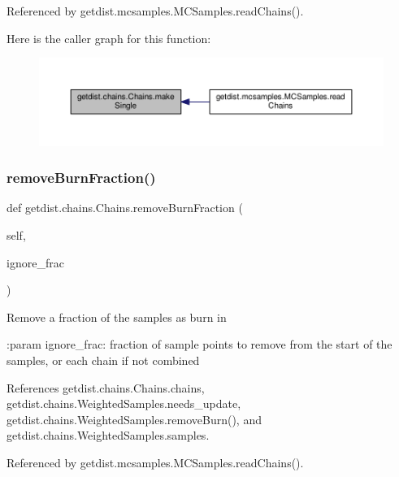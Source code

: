 Referenced by getdist.\+mcsamples.\+M\+C\+Samples.\+read\+Chains().

Here is the caller graph for this function\+:
\nopagebreak
\begin{figure}[H]
\begin{center}
\leavevmode
\includegraphics[width=350pt]{classgetdist_1_1chains_1_1Chains_abf8a89dbd2d048f01330ed93e6ea226e_icgraph}
\end{center}
\end{figure}
\mbox{\label{classgetdist_1_1chains_1_1Chains_afdf14ad21843a394732184ae26433d6e}} 
\subsubsection{\texorpdfstring{remove\+Burn\+Fraction()}{removeBurnFraction()}}
{\footnotesize\ttfamily def getdist.\+chains.\+Chains.\+remove\+Burn\+Fraction (\begin{DoxyParamCaption}\item[{}]{self,  }\item[{}]{ignore\+\_\+frac }\end{DoxyParamCaption})}

\begin{DoxyVerb}Remove a fraction of the samples as burn in

:param ignore_frac: fraction of sample points to remove from the start of the samples, or each chain if not combined
\end{DoxyVerb}
 

References getdist.\+chains.\+Chains.\+chains, getdist.\+chains.\+Weighted\+Samples.\+needs\+\_\+update, getdist.\+chains.\+Weighted\+Samples.\+remove\+Burn(), and getdist.\+chains.\+Weighted\+Samples.\+samples.



Referenced by getdist.\+mcsamples.\+M\+C\+Samples.\+read\+Chains().

